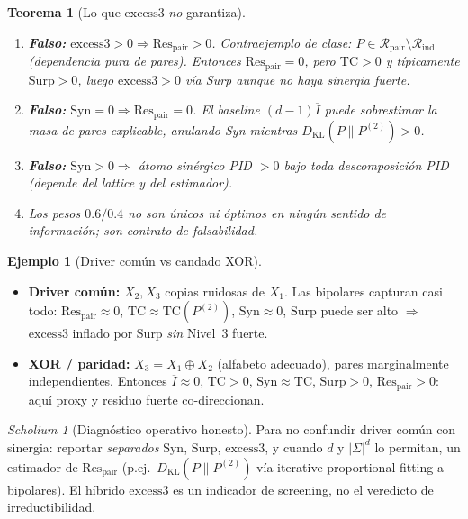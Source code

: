 \documentclass[11pt,a4paper]{article}
\theoremstyle{definition}
\newtheorem{example}{Ejemplo}[section]
\theoremstyle{plain}
\newtheorem{theorem}{Teorema}[section]
\theoremstyle{remark}
\newtheorem{scholium}{Scholium}[section]
\newcommand{\Res}{\mathrm{Res}}
\newcommand{\TC}{\mathrm{TC}}
\newcommand{\Syn}{\mathrm{Syn}}
\newcommand{\Surp}{\mathrm{Surp}}
\newcommand{\excess}{\mathrm{excess3}}
\newcommand{\Rind}{\mathcal{R}_{\mathrm{ind}}}
\newcommand{\Rpair}{\mathcal{R}_{\mathrm{pair}}}
\newcommand{\KL}{D_{\mathrm{KL}}}
\begin{document}
\begin{theorem}[Lo que $\excess$ \emph{no} garantiza]
\label{thm:excess_no}
\begin{enumerate}[label=(\roman*)]
  \item \textbf{Falso:} $\excess>0\Rightarrow\Res_{\mathrm{pair}}>0$.
  Contraejemplo de clase: $P\in\Rpair\setminus\Rind$ (dependencia pura de
  pares). Entonces $\Res_{\mathrm{pair}}=0$, pero $\TC>0$ y t\'ipicamente
  $\Surp>0$, luego $\excess>0$ v\'ia Surp aunque no haya sinergia fuerte.
  \item \textbf{Falso:} $\Syn=0\Rightarrow\Res_{\mathrm{pair}}=0$.
  El baseline $(d-1)\overline{I}$ puede sobrestimar la masa de pares
  explicable, anulando Syn mientras $\KL(P\|P^{(2)})>0$.
  \item \textbf{Falso:} $\Syn>0\Rightarrow$ \'atomo sin\'ergico PID $>0$
  bajo toda descomposici\'on PID (depende del lattice y del estimador).
  \item Los pesos $0.6/0.4$ no son \'unicos ni \'optimos en ning\'un
  sentido de informaci\'on; son contrato de falsabilidad.
\end{enumerate}
\end{theorem}

\begin{example}[Driver com\'un vs candado XOR]
\label{ex:driver_xor}
\begin{itemize}
  \item \textbf{Driver com\'un:} $X_2,X_3$ copias ruidosas de $X_1$.
  Las bipolares capturan casi todo: $\Res_{\mathrm{pair}}\approx 0$,
  $\TC\approx\TC(P^{(2)})$, $\Syn\approx 0$, $\Surp$ puede ser alto
  $\Rightarrow$ $\excess$ inflado por Surp \emph{sin} Nivel~3 fuerte.
  \item \textbf{XOR / paridad:} $X_3=X_1\oplus X_2$ (alfabeto adecuado),
  pares marginalmente independientes. Entonces $\overline{I}\approx 0$,
  $\TC>0$, $\Syn\approx\TC$, $\Surp>0$, $\Res_{\mathrm{pair}}>0$:
  aqu\'i proxy y residuo fuerte co-direccionan.
\end{itemize}
\end{example}

\begin{scholium}[Diagn\'ostico operativo honesto]
Para no confundir driver com\'un con sinergia:
reportar \emph{separados} $\Syn$, $\Surp$, $\excess$, y cuando $d$ y
$|\Sigma|^d$ lo permitan, un estimador de $\Res_{\mathrm{pair}}$
(p.ej.\ $\KL(P\|P^{(2)})$ v\'ia iterative proportional fitting a
bipolares). El h\'ibrido $\excess$ es un indicador de screening, no el
veredicto de irreductibilidad.
\end{scholium}
\end{document}
